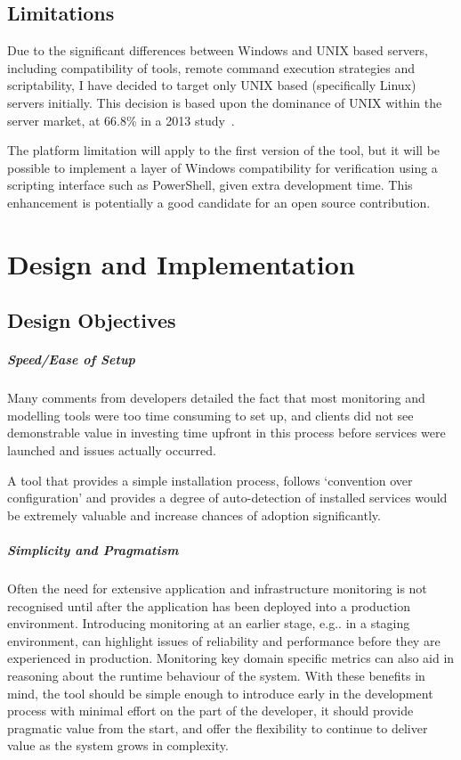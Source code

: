 \documentclass{cshonours}
\begin{document}
\section{Limitations}

Due to the significant differences between Windows and UNIX based servers, including compatibility of tools, remote command execution strategies and scriptability, I have decided to target only UNIX based (specifically Linux) servers initially. This decision is based upon the dominance of UNIX within the server market, at 66.8\% in a 2013 study~\cite{UnixMarketShare}.

The platform limitation will apply to the first version of the tool, but it will be possible to implement a layer of Windows compatibility for verification using a scripting interface such as PowerShell, given extra development time. This enhancement is potentially a good candidate for an open source contribution.

\chapter{Design and Implementation}

\section{Design Objectives}

\paragraph{Speed/Ease of Setup} Many comments from developers detailed the fact that most monitoring and modelling tools were too time consuming to set up, and clients did not see demonstrable value in investing time upfront in this process before services were launched and issues actually occurred. 

A tool that provides a simple installation process, follows ‘convention over configuration’ and provides a degree of auto-detection of installed services would be extremely valuable and increase chances of adoption significantly.

\paragraph{Simplicity and Pragmatism} Often the need for extensive application and infrastructure monitoring is not recognised until after the application has been deployed into a production environment. Introducing monitoring at an earlier stage, e.g.. in a staging environment, can highlight issues of reliability and performance before they are experienced in production. Monitoring key domain specific metrics can also aid in reasoning about the runtime behaviour of the system. With these benefits in mind, the tool should be simple enough to introduce early in the development process with minimal effort on the part of the developer, it should provide pragmatic value from the start, and offer the flexibility to continue to deliver value as the system grows in complexity.
\end{document}
